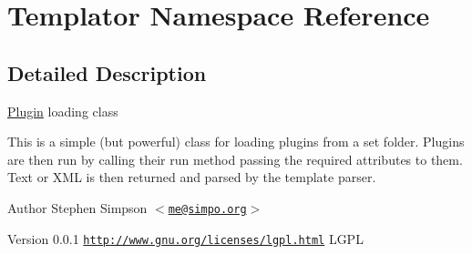 \hypertarget{namespaceTemplator}{
\section{Templator Namespace Reference}
\label{namespaceTemplator}
}


\subsection{Detailed Description}
\hyperlink{classPlugin}{Plugin} loading class

This is a simple (but powerful) class for loading plugins from a set folder. Plugins are then run by calling their run method passing the required attributes to them. Text or XML is then returned and parsed by the template parser.

\begin{DoxyAuthor}{Author}
Stephen Simpson $<$\href{mailto:me@simpo.org}{\tt me@simpo.org}$>$ 
\end{DoxyAuthor}
\begin{DoxyVersion}{Version}
0.0.1  \href{http://www.gnu.org/licenses/lgpl.html}{\tt http://www.gnu.org/licenses/lgpl.html} LGPL 
\end{DoxyVersion}
